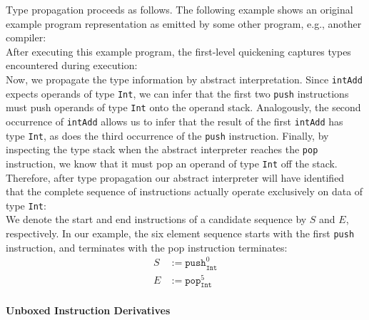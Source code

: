 \documentclass[preprint,10pt]{popl14conf}
\begin{document}
Type propagation proceeds as follows.
The following example shows an original example program representation as emitted by some other
program, e.g., another compiler:
\begin{equation*}
  [\cdots, \mathtt{push}^{0}, \mathtt{push}^{1}, \mathtt{addOp}^{2}, \mathtt{push}^{3}, \mathtt{addOp}^{4}, \mathtt{pop}^{5}, \cdots]
\end{equation*}
After executing this example program, the first-level quickening captures types encountered during
execution:
\begin{equation*}
  [\cdots, \mathtt{push}^{0}, \mathtt{push}^{1}, \mathtt{intAdd}^{2}, \mathtt{push}^{3}, \mathtt{intAdd}^{4}, \mathtt{pop}^{5}, \cdots]
\end{equation*}
Now, we propagate the type information by abstract interpretation.
Since \texttt{intAdd} expects operands of type \texttt{Int}, we can infer that the first two
\texttt{push} instructions must push operands of type \texttt{Int} onto the operand stack.
Analogously, the second occurrence of \texttt{intAdd} allows us to infer that the result of the
first \texttt{intAdd} has type \texttt{Int}, as does the third occurrence of the \texttt{push}
instruction.
Finally, by inspecting the type stack when the abstract interpreter reaches the \texttt{pop}
instruction, we know that it must pop an operand of type \texttt{Int} off the stack.
Therefore, after type propagation our abstract interpreter will have identified that the complete
sequence of instructions actually operate exclusively on data of type \texttt{Int}:
\begin{equation*}
  [\cdots, \mathtt{push}_{\mathtt{Int}}^{0}, \mathtt{push}_{\mathtt{Int}}^{1}, \mathtt{intAdd}^{2}, \mathtt{push}_{\mathtt{Int}}^{3}, \mathtt{intAdd}^{4},  \mathtt{pop}_{\mathtt{Int}}^{5}, \cdots]
\end{equation*}
We denote the start and end instructions of a candidate sequence by $S$ and $E$, respectively.
In our example, the six element sequence starts with the first \texttt{push} instruction, and
terminates with the {pop} instruction terminates:
\begin{align*}
  S &:= \mathtt{push}_{\mathtt{Int}}^{0} \\
  E &:= \mathtt{pop}_{\mathtt{Int}}^{5}
\end{align*}




\paragraph{Unboxed Instruction Derivatives}
\end{document}
